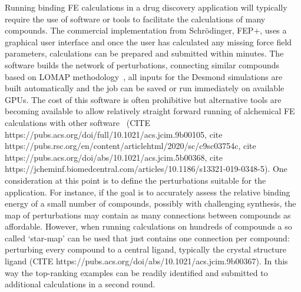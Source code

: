 \documentclass[9pt,bestpractices]{livecoms}
\begin{document}
Running binding FE calculations in a drug discovery application will typically require the use of software or tools to facilitate the calculations of many compounds. The commercial implementation from Schr\"{o}dinger, FEP+, uses a graphical user interface and once the user has calculated any missing force field parameters, calculations can be prepared and submitted within minutes. The software builds the network of perturbations, connecting similar compounds based on LOMAP methodology~\cite{liu2013lead}, all inputs for the Desmond simulations are built automatically and the job can be saved or run immediately on available GPUs. The cost of this software is often prohibitive but alternative tools are becoming available to allow relatively straight forward running of alchemical FE calculations with other software~\cite{gapsys2015pmx, loeffler2015fesetup} (CITE https://pubs.acs.org/doi/full/10.1021/acs.jcim.9b00105, cite https://pubs.rsc.org/en/content/articlehtml/2020/sc/c9sc03754c, cite https://pubs.acs.org/doi/abs/10.1021/acs.jcim.5b00368, cite https://jcheminf.biomedcentral.com/articles/10.1186/s13321-019-0348-5). One consideration at this point is to define the perturbations suitable for the application. For instance, if the goal is to accurately assess the relative binding energy of a small number of compounds, possibly with challenging synthesis, the map of perturbations may contain as many connections between compounds as affordable. However, when running calculations on hundreds of compounds a so called ‘star-map’ can be used that just contains one connection per compound: perturbing every compound to a central ligand, typically the crystal structure ligand (CITE https://pubs.acs.org/doi/abs/10.1021/acs.jcim.9b00367). In this way the top-ranking examples can be readily identified and submitted to additional calculations in a second round. 
%
\end{document}
